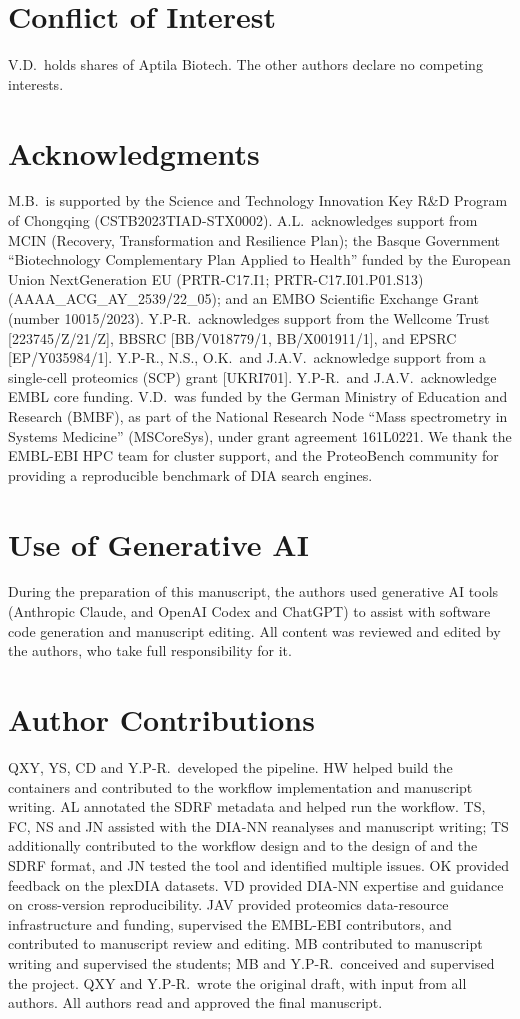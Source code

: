 \documentclass[preprint,12pt]{elsarticle}
\begin{document}
\section*{Conflict of Interest}
V.D.\ holds shares of Aptila Biotech. The other authors declare no competing interests.

\section*{Acknowledgments}
M.B.\ is supported by the Science and Technology Innovation Key R\&D Program of Chongqing (CSTB2023TIAD-STX0002). A.L.\ acknowledges support from MCIN (Recovery, Transformation and Resilience Plan); the Basque Government ``Biotechnology Complementary Plan Applied to Health'' funded by the European Union NextGeneration EU (PRTR-C17.I1; PRTR-C17.I01.P01.S13) (AAAA\_ACG\_AY\_2539/22\_05); and an EMBO Scientific Exchange Grant (number 10015/2023). Y.P-R.\ acknowledges support from the Wellcome Trust [223745/Z/21/Z], BBSRC [BB/V018779/1, BB/X001911/1], and EPSRC [EP/Y035984/1]. Y.P-R., N.S., O.K.\ and J.A.V.\ acknowledge support from a single-cell proteomics (SCP) grant [UKRI701]. Y.P-R.\ and J.A.V.\ acknowledge EMBL core funding. V.D.\ was funded by the German Ministry of Education and Research (BMBF), as part of the National Research Node ``Mass spectrometry in Systems Medicine'' (MSCoreSys), under grant agreement 161L0221. We thank the EMBL-EBI HPC team for cluster support, and the ProteoBench community for providing a reproducible benchmark of DIA search engines.

\section*{Use of Generative AI}
During the preparation of this manuscript, the authors used generative AI tools (Anthropic Claude, and OpenAI Codex and ChatGPT) to assist with software code generation and manuscript editing. All content was reviewed and edited by the authors, who take full responsibility for it.

\section*{Author Contributions}
QXY, YS, CD and Y.P-R.\ developed the pipeline. HW helped build the containers and contributed to the workflow implementation and manuscript writing. AL annotated the SDRF metadata and helped run the workflow.
TS, FC, NS and JN assisted with the DIA-NN reanalyses and manuscript writing; TS additionally contributed to the workflow design and to the design of \qpx{} and the SDRF format, and JN tested the tool and identified multiple issues. OK provided feedback on the plexDIA datasets. VD provided DIA-NN expertise and guidance on cross-version reproducibility. JAV provided proteomics data-resource infrastructure and funding, supervised the EMBL-EBI contributors, and contributed to manuscript review and editing. MB contributed to manuscript writing and supervised the students; MB and Y.P-R.\ conceived and supervised the project. QXY and Y.P-R.\ wrote the original draft, with input from all authors. All authors read and approved the final manuscript.
\end{document}
